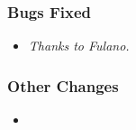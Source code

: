 \documentclass[12pt]{article}
\newcommand{\mpom}[0]{\mbox{MP-Opt-Model}}
\newcommand{\code}[1]{{\relsize{-0.5}{\tt{{#1}}}}}  %
\numberwithin{equation}{section}
\numberwithin{table}{section}
\numberwithin{figure}{section}
\begin{document}
\begin{appendices}
\subsubsection*{Bugs Fixed}
\begin{itemize}
\item 
    \emph{Thanks to Fulano.}
\end{itemize}

\subsubsection*{Other Changes}
\begin{itemize}
\item 

\end{itemize}


% 
% 
% 
% 
% 

\end{appendices}
\end{document}
